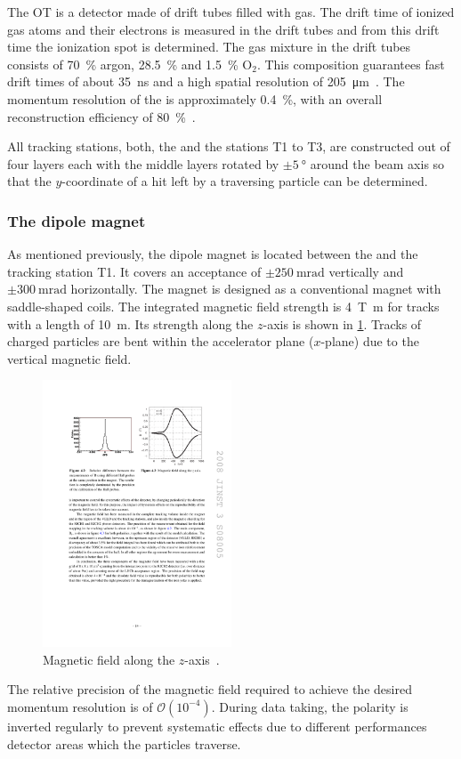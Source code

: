The OT is a detector made of drift tubes filled with gas.
The drift time of ionized gas atoms and their electrons is measured in the drift tubes and from this drift time the ionization spot is determined.
The gas mixture in the drift tubes consists of \SI{70}{\percent} argon, \SI{28.5}{\percent} \cotwo and \SI{1.5}{\percent} $\mathrm O_2$.
This composition guarantees fast drift times of about \SI{35}{\nano\second} and a high spatial resolution of \SI{205}{\micro\metre}~\cite{Aaij:2014jba}.
The momentum resolution of the \ot is approximately \SI{0.4}{\percent}, with an overall reconstruction efficiency of \SI{80}{\percent}~\cite{Alves:2008zz}.

All tracking stations, \ie both, the \ttracker and the stations T1 to T3, are constructed out of four layers each with the middle layers rotated by $\pm\SI{5}{\degree}$ around the beam axis so that the $y$-coordinate of a hit left by a traversing particle can be determined.

\subsubsection*{The dipole magnet}
\label{sec:magnet}

As mentioned previously, the dipole magnet is located between the \ttracker and the tracking station T1.
It covers an acceptance of $\pm\SI{250}{\milli\radian}$ vertically and $\pm\SI{300}{\milli\radian}$ horizontally.
The magnet is designed as a conventional magnet with saddle-shaped coils.
The integrated magnetic field strength is \SI{4}{\tesla\metre} for tracks with a length of \SI{10}{\metre}.
Its strength along the $z$-axis is shown in \cref{fig:MagField}.
Tracks of charged particles are bent within the accelerator plane ($x$-plane) due to the vertical magnetic field.
\begin{figure}[tbp]
    \centering
    \includegraphics[width=0.5\textwidth]{05lhcb/figs/magnetField.pdf}
    \caption{Magnetic field along the $z$-axis~\cite{Alves:2008zz}.}
    \label{fig:MagField}
\end{figure}
The relative precision of the magnetic field required to achieve the desired momentum resolution is of $\mathcal{O}\!\left(10^{-4}\right)$.
During data taking, the polarity is inverted regularly to prevent systematic effects due to \eg different performances detector areas which the particles traverse.


